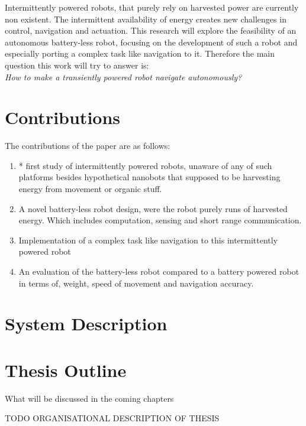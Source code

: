 Intermittently powered robots, that purely rely on harvested power are currently non existent.
The intermittent availability of energy creates new challenges in control, navigation and actuation. 
This research will explore the feasibility of an autonomous battery-less robot, focusing on the development of such a robot and especially porting a complex task like navigation to it. 
Therefore the main question this work will try to answer is: \\
\textit{How to make a transiently powered robot navigate autonomously?}

\section{Contributions}

The contributions of the paper are as follows:

\begin{enumerate}

\item * first study of intermittently powered robots, unaware of any of such platforms besides hypothetical nanobots that supposed to be harvesting energy from movement or organic stuff.

\item A novel battery-less robot design, were the robot purely runs of harvested energy. Which includes computation, sensing and short range communication.

\item Implementation of a complex task like navigation to this intermittently powered robot

\item An evaluation of the battery-less robot compared to a battery powered robot in terms of, weight, speed of movement and navigation accuracy.
\end{enumerate}

\section{System Description}


\section{Thesis Outline}
What will be discussed in the coming chapters


\vspace{1\baselineskip}

\noindent
TODO ORGANISATIONAL DESCRIPTION OF THESIS

